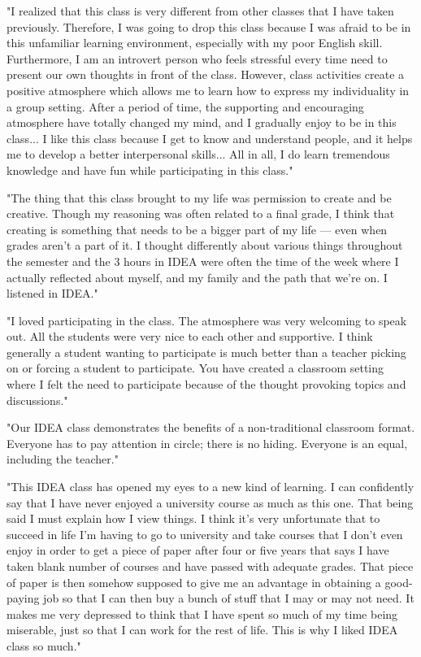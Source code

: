 \documentclass[letterpaper,10pt,headsepline]{scrreprt}
\begin{document}
"I realized that this class is very different from other classes that I have taken previously. Therefore, I was going to drop this class because I was afraid to be in this unfamiliar learning environment, especially with my poor English skill. Furthermore, I am an introvert person who feels stressful every time need to present our own thoughts in front of the class. However, class activities create a positive atmosphere which allows me to learn how to express my individuality in a group setting. After a period of time, the supporting and encouraging atmosphere have totally changed my mind, and I gradually enjoy to be in this class... I like this class because I get to know and understand people, and it helps me to develop a better interpersonal skills... All in all, I do learn tremendous knowledge and have fun while participating in this class."
\vspace{2em}

"The thing that this class brought to my life was permission to create
and be creative. Though my reasoning was often related to a final
grade, I think that creating is something that needs to be a bigger
part of my life — even when grades aren't a part of it. I thought
differently about various things throughout the semester and the 3
hours in IDEA were often the time of the week where I actually
reflected about myself, and my family and the path that we're on. I
listened in IDEA."
\vspace{2em}

"I loved participating in the class. The atmosphere was very welcoming to speak out. All the students were very nice to each other and supportive. I think generally a student wanting to participate is much better than a teacher picking on or forcing a student to participate. You have created a classroom setting where I felt the need to participate because of the thought provoking topics and discussions."
\vspace{2em}

"Our IDEA class demonstrates the benefits of a non-traditional classroom format. Everyone has to pay attention in circle; there is no hiding. Everyone is an equal, including the teacher."
\vspace{2em}

"This IDEA class has opened my eyes to a new kind of learning. I can confidently say that I have never enjoyed a university course as much as this one. That being said I must explain how I view things. I think it’s very unfortunate that to succeed in life I’m having to go to university and take courses that I don’t even enjoy in order to get a piece of paper after four or five years that says I have taken blank number of courses and have passed with adequate grades. That piece of paper is then somehow supposed to give me an advantage in obtaining a good-paying job so that I can then buy a bunch of stuff that I may or may not need. It makes me very depressed to think that I have spent so much of my time being miserable, just so that I can work for the rest of life. This is why I liked IDEA class so much."
\vspace{2em}
\end{document}
